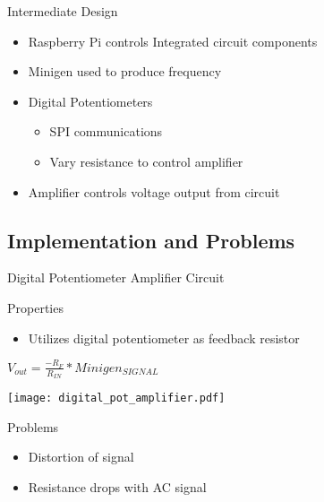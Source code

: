 \begin{frame}{Intermediate Design}
  \begin{block}{}
  \begin{itemize}
    \item Raspberry Pi controls Integrated circuit components
    \item Minigen used to produce frequency
    \item Digital Potentiometers
      \begin{itemize}
      \item SPI communications
      \item Vary resistance to control amplifier
      \end{itemize}
    \item Amplifier controls voltage output from circuit
  \end{itemize}
  \end{block}
\end{frame}

\subsection{Implementation and Problems}

\begin{frame}{Digital Potentiometer Amplifier Circuit }
  \begin{block}{Properties}
  \begin{itemize}
    \item Utilizes digital potentiometer as feedback resistor
  \end{itemize}

  \begin{center}
    $V_{out} = \frac{-R_F}{R_{IN}} * Minigen_{SIGNAL}$
  \end{center}
  \end{block}

  \begin{center}
  \texttt{[image: digital\_pot\_amplifier.pdf]}
  \end{center}

  \begin{block}{Problems}
    \begin{itemize}
      \item Distortion of signal
      \item Resistance drops with AC signal
    \end{itemize}    
  \end{block}
\end{frame}

